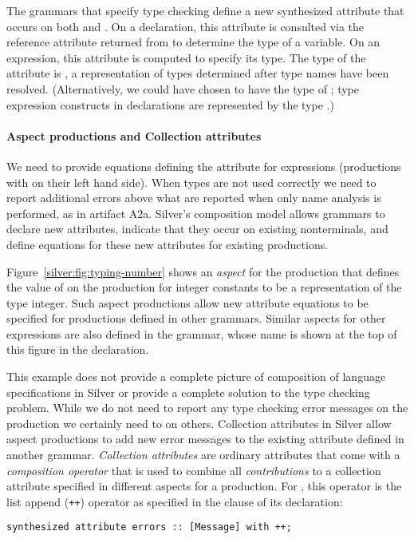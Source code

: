 The grammars that specify type checking define a new synthesized
attribute  that occurs on both  and .
%
On a declaration, this attribute is consulted via the reference
attribute returned from  to determine the type of a
variable.  On an expression, this attribute is computed to specify its
type.
%
The type of the  attribute is , a
representation of types determined after type names have been
resolved.  (Alternatively, we could have chosen  to have the
type of ; type expression constructs in
declarations are represented by the type .)

\paragraph{Aspect productions and Collection attributes}

We need to provide equations defining the  attribute for
expressions (productions with  on their left hand side).
When types are not used correctly we need to report additional errors
above what are reported when only name analysis is performed, as in
artifact A2a.
%
Silver's composition model allows grammars to declare new attributes,
indicate that they occur on existing nonterminals, and define
equations for these new attributes for existing productions.

Figure~\ref{silver:fig:typing-number} shows an \emph{aspect} for the
production  that defines the value of  on
the production for integer constants to be a representation of the
type integer.  Such aspect productions allow new attribute equations
to be specified for productions defined in other grammars. Similar
aspects for other expressions are also defined in the grammar, whose
name is shown at the top of this figure in the 
declaration.

This example does not provide a complete picture of composition of
language specifications in Silver or provide a complete solution to
the type checking problem.  While we do not need to report any type
checking error messages on the  production we certainly
need to on others.
%
Collection attributes in Silver allow aspect productions to add new
error messages to the existing  attribute defined in
another grammar.
\emph{Collection attributes} are ordinary attributes that come with a
\textit{composition operator} that is used to combine all
\emph{contributions} to a collection attribute specified in different
aspects for a production.  For , this operator is the
list append (\texttt{++}) operator as specified in the 
clause of its declaration:
%
\begin{verbatim}
synthesized attribute errors :: [Message] with ++;
\end{verbatim}
%

